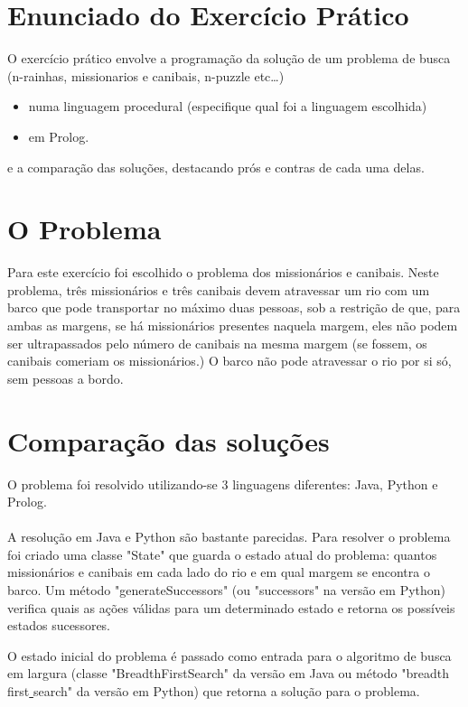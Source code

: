 \documentclass[12pt,a4paper]{article}
\begin{document}
\section{Enunciado do Exercício Prático}

O exercício prático envolve a programação da solução de um problema de busca (n-rainhas, missionarios e canibais, n-puzzle etc…)
\begin{itemize}
\item numa linguagem procedural (especifique qual foi a linguagem escolhida)
\item em Prolog.
\end{itemize}
e a comparação das soluções, destacando prós e contras de cada uma delas.


\section{O Problema}

Para este exercício foi escolhido o problema dos missionários e canibais. Neste problema, três missionários e três canibais devem atravessar um rio com um barco que pode transportar no máximo duas pessoas, sob a restrição de que, para ambas as margens, se há missionários presentes naquela margem, eles não podem ser ultrapassados pelo número de canibais na mesma margem (se fossem, os canibais comeriam os missionários.) O barco não pode atravessar o rio por si só, sem pessoas a bordo.

\section{Comparação das soluções}

O problema foi resolvido utilizando-se 3 linguagens diferentes: Java, Python e Prolog.

\paragraph{}

A resolução em Java e Python são bastante parecidas. Para resolver o problema foi criado uma classe "State" que guarda o estado atual do problema: quantos missionários e canibais em cada lado do rio e em qual margem se encontra o barco. Um método "generateSuccessors" (ou "successors" na versão em Python) verifica quais as ações válidas para um determinado estado e retorna os possíveis estados sucessores.

O estado inicial do problema é passado como entrada para o algoritmo de busca em largura (classe "BreadthFirstSearch" da versão em Java ou método "breadth\underline{ }first\underline{ }search" da versão em Python) que retorna a solução para o problema.
\end{document}
